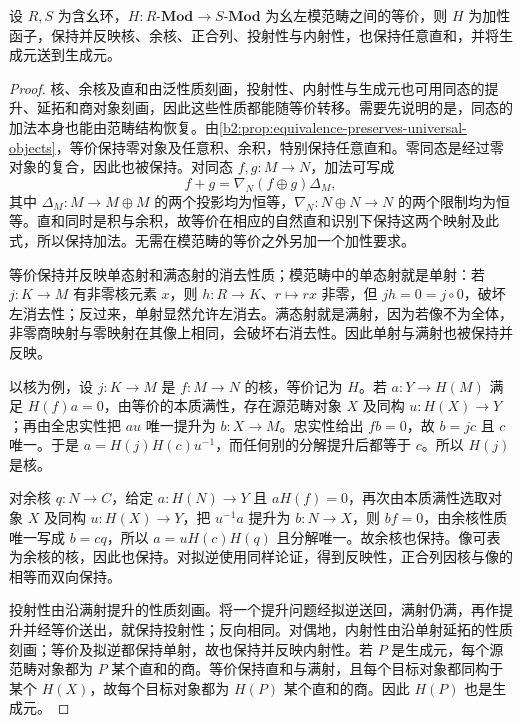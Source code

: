 \begin{lemma}\label{b2:lem:module-equivalence-structure}
	设 \(R,S\) 为含幺环，\(H:R\text{-}\mathbf{Mod}\rightarrow S\text{-}\mathbf{Mod}\) 为幺左模范畴之间的等价，则 \(H\) 为加性函子，保持并反映核、余核、正合列、投射性与内射性，也保持任意直和，并将生成元送到生成元。
\end{lemma}
\begin{proof}
	核、余核及直和由泛性质刻画，投射性、内射性与生成元也可用同态的提升、延拓和商对象刻画，因此这些性质都能随等价转移。需要先说明的是，同态的加法本身也能由范畴结构恢复。由\cref{b2:prop:equivalence-preserves-universal-objects}，等价保持零对象及任意积、余积，特别保持任意直和。零同态是经过零对象的复合，因此也被保持。对同态 \(f,g:M\rightarrow N\)，加法可写成
	\[
		f+g=\nabla_N(f\oplus g)\Delta_M,
	\]
	其中 \(\Delta_M:M\rightarrow M\oplus M\) 的两个投影均为恒等，\(\nabla_N:N\oplus N\rightarrow N\) 的两个限制均为恒等。直和同时是积与余积，故等价在相应的自然直和识别下保持这两个映射及此式，所以保持加法。无需在模范畴的等价之外另加一个加性要求。

	等价保持并反映单态射和满态射的消去性质；模范畴中的单态射就是单射：若 \(j:K\to M\) 有非零核元素 \(x\)，则 \(h:R\to K\)、\(r\mapsto rx\) 非零，但 \(jh=0=j\circ0\)，破坏左消去性；反过来，单射显然允许左消去。满态射就是满射，因为若像不为全体，非零商映射与零映射在其像上相同，会破坏右消去性。因此单射与满射也被保持并反映。

	以核为例，设 \(j:K\rightarrow M\) 是 \(f:M\rightarrow N\) 的核，等价记为 \(H\)。若 \(a:Y\rightarrow H(M)\) 满足 \(H(f)a=0\)，由等价的本质满性，存在源范畴对象 \(X\) 及同构 \(u:H(X)\rightarrow Y\)；再由全忠实性把 \(au\) 唯一提升为 \(b:X\rightarrow M\)。忠实性给出 \(fb=0\)，故 \(b=jc\) 且 \(c\) 唯一。于是 \(a=H(j)H(c)u^{-1}\)，而任何别的分解提升后都等于 \(c\)。所以 \(H(j)\) 是核。

	对余核 \(q:N\rightarrow C\)，给定 \(a:H(N)\rightarrow Y\) 且 \(aH(f)=0\)，再次由本质满性选取对象 \(X\) 及同构 \(u:H(X)\rightarrow Y\)，把 \(u^{-1}a\) 提升为 \(b:N\rightarrow X\)，则 \(bf=0\)，由余核性质唯一写成 \(b=cq\)，所以 \(a=uH(c)H(q)\) 且分解唯一。故余核也保持。像可表为余核的核，因此也保持。对拟逆使用同样论证，得到反映性，正合列因核与像的相等而双向保持。

	投射性由沿满射提升的性质刻画。将一个提升问题经拟逆送回，满射仍满，再作提升并经等价送出，就保持投射性；反向相同。对偶地，内射性由沿单射延拓的性质刻画；等价及拟逆都保持单射，故也保持并反映内射性。若 \(P\) 是生成元，每个源范畴对象都为 \(P\) 某个直和的商。等价保持直和与满射，且每个目标对象都同构于某个 \(H(X)\)，故每个目标对象都为 \(H(P)\) 某个直和的商。因此 \(H(P)\) 也是生成元。
\end{proof}


